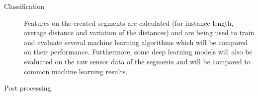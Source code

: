 \begin{description}
\item[Classification] Features on the created segments are calculated (for instance length, average distance and variation of the distances) and are being used to train and evaluate several machine learning algorithms which will be compared on their performance. Furthermore, some deep learning models will also be evaluated on the raw sensor data of the segments and will be compared to common machine learning results.

\item[Post processing] 

\end{description}






%
